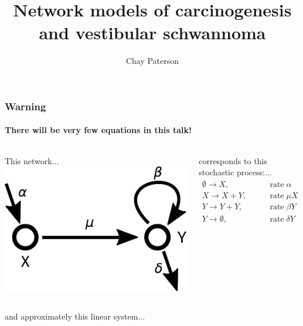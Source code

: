 \documentclass{beamer}
\title{Network models of carcinogenesis and vestibular schwannoma}
\author{Chay Paterson}
\institute{University of Manchester*}
\date{28 March 2022

\;

\tiny{*(sort of)}}
\begin{document}

\frame{\titlepage}

\begin{frame}
    \frametitle{Warning}
    \framesubtitle{There will be very few equations in this talk!}

    \begin{columns}
        \begin{column}{0.6\textwidth}
        This network...
        \includegraphics[width=\textwidth]{figures/diagram1}
        \end{column}
        \begin{column}{0.4\textwidth}
        corresponds to this stochastic process:...
        \begin{align}
            \emptyset \rightarrow X, &\qquad \mathrm{rate\;}\alpha
            \nonumber \\
            X \rightarrow X + Y, &\qquad\mathrm{rate\;}\mu X
            \nonumber \\
            Y \rightarrow Y + Y, &\qquad\mathrm{rate\;} \beta Y
            \nonumber \\
            Y \rightarrow \emptyset, &\qquad\mathrm{rate\;} \delta Y
            \nonumber
        \end{align}
        \end{column}
    \end{columns}

    and approximately this linear system...


\end{frame}
\end{document}
